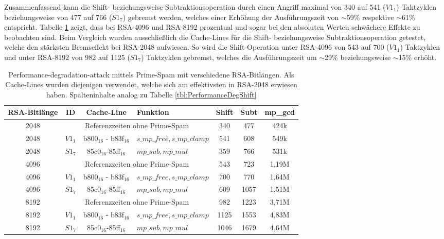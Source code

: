 Zusammenfassend kann die Shift- beziehungsweise Subtraktionsoperation durch einen Angriff maximal von 340 auf 541 ($V1_1$) Taktzyklen beziehungsweise von 477 auf 766 ($S1_7$) gebremst werden, welches einer Erhöhung der Ausführungszeit von $\sim$59\% respektive $\sim$61\% entspricht.
Tabelle \ref{tbl:PerformanceDegR$S2_6$ifferentBitlength} zeigt, dass bei RSA-4096 und RSA-8192 prozentual und sogar bei den absoluten Werten schwächere Effekte zu beobachten sind.
Beim Vergleich wurden ausschließlich die Cache-Lines für die Shift- beziehungsweise Subtraktionsoperation getestet, welche den stärksten Bremseffekt bei RSA-2048 aufwiesen.
So wird die Shift-Operation unter RSA-4096 von 543 auf 700 ($V1_1$) Taktzyklen und unter RSA-8192 von 982 auf 1125 ($S1_7$) Taktzyklen gebremst, welches die Ausführungszeit um $\sim$29\% beziehungsweise $\sim$15\% erhöht.

\begin{table}[h]
\caption{Performance-degradation-attack mittels Prime-Spam mit verschiedene RSA-Bitlängen.
Als Cache-Lines wurden diejenigen verwendet, welche sich am effektivsten in RSA-2048 erwiesen haben.
Spalteninhalte analog zu Tabelle \ref{tbl:PerformanceDegShift}}
\label{tbl:PerformanceDegR$S2_6$ifferentBitlength}
\begin{tabular}{ccclccc}
\toprule
RSA-Bitlänge & ID & Cache-Line & Funktion & Shift & Subt & mp\_gcd \\
\midrule
2048         &\multicolumn{3}{c}{Referenzzeiten ohne Prime-Spam}                                         & 340   & 477         & 424k    \\
2048         & $V1_1$& b800$_{16}$ - b83f$_{16}$ & $s\_mp\_free, s\_mp\_clamp$                 & 541   & 608         & 549k    \\
2048         & $S1_7$& 85c0$_{16}$-85ff$_{16}$  & $mp\_sub, mp\_mul$            & 359   & 766         & 531k    \\
\midrule
4096         & \multicolumn{3}{c}{Referenzzeiten ohne Prime-Spam}                                         & 543   & 723         & 1,19M    \\
4096         & $V1_1$& b800$_{16}$ - b83f$_{16}$ & $s\_mp\_free, s\_mp\_clamp$                 & 700   & 770         & 1,64M    \\
4096         & $S1_7$& 85c0$_{16}$-85ff$_{16}$  & $mp\_sub, mp\_mul$            & 609   & 1057         & 1,51M    \\
\midrule
8192         & \multicolumn{3}{c}{Referenzzeiten ohne Prime-Spam}                                         & 982   & 1223         & 3,71M    \\
8192         & $V1_1$& b800$_{16}$ - b83f$_{16}$ & $s\_mp\_free, s\_mp\_clamp$                 & 1125   & 1553         & 4,83M    \\
8192         & $S1_7$& 85c0$_{16}$-85ff$_{16}$  & $mp\_sub, mp\_mul$            & 1046   & 1679         & 4,64M    \\
\bottomrule
\end{tabular}
\end{table}

